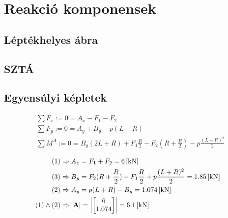 \section{Reakció komponensek}

\subsection{Léptékhelyes ábra}
\subsection{SZTÁ}

\newpage

\subsection{Egyensúlyi képletek}

\begin{align}
	&\sum{F_x} := 0 = A_x - F_1 - F_2 \\
	&\sum{F_y} := 0 = A_y + B_y - p(L+R) \\
	&\sum{M^A} := 0 = B_y(2L+R) + F_1 \frac{R}{2} - F_2 (R+\frac{R}{2}) - p\frac{(L+R)^2}{2}
\end{align}

\begin{align}
	(1) &\Rightarrow A_x = F_1 + F_2 = \SI{6}{[\kilo\newton]} \\
	(3) &\Rightarrow B_y 
		= F_2 (R + \frac{R}{2}) - F_1\frac{R}{2} + p\frac{(L+R)^2}{2} 
		= \SI{1.85}{[\kilo\newton]} \\
	(2) &\Rightarrow A_y = p(L+R) - B_y = \SI{1.074}{[\kilo\newton]} \\
	(1) \land (2) &\Rightarrow |\textbf{A}| = 
	\left|\begin{bmatrix}
		6 \\
		1.074
	\end{bmatrix}\right| = \SI{6.1}{[\kilo\newton]}
\end{align}
